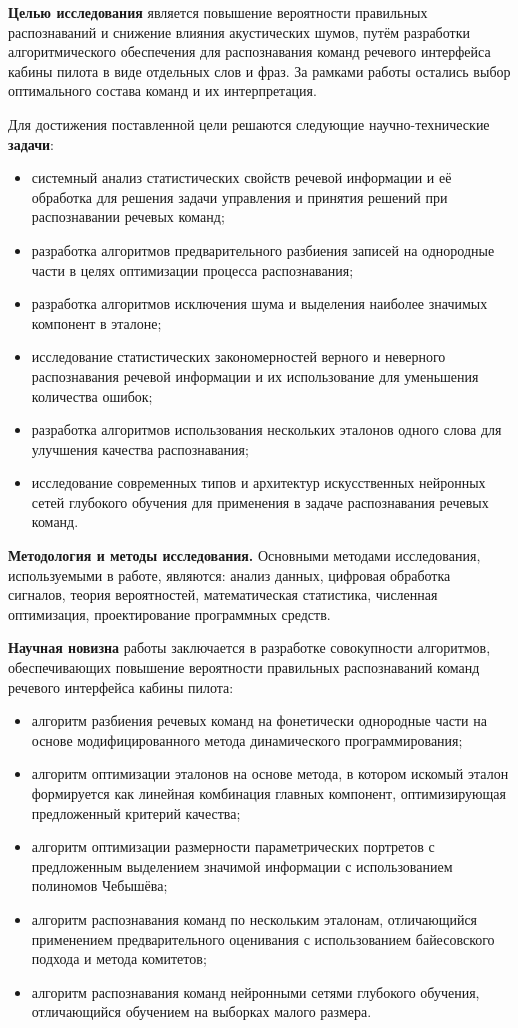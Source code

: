\textbf{Целью исследования} является повышение вероятности правильных распознаваний и снижение влияния акустических шумов, путём разработки алгоритмического обеспечения для распознавания команд речевого интерфейса кабины пилота в виде отдельных слов и фраз.
За рамками работы остались выбор оптимального состава команд и их интерпретация.

Для достижения поставленной цели решаются следующие научно-технические \textbf{задачи}:
\begin{itemize}
	\item системный анализ статистических свойств речевой информации и её обработка для решения задачи управления и принятия решений при распознавании речевых команд;
	\item разработка алгоритмов предварительного разбиения записей на однородные части в целях оптимизации процесса распознавания;
	\item разработка алгоритмов исключения шума и выделения наиболее значимых компонент в эталоне;
	\item исследование статистических закономерностей верного и неверного распознавания речевой информации и их использование для уменьшения количества ошибок;
	\item разработка алгоритмов использования нескольких эталонов одного слова для улучшения качества распознавания;
	\item исследование современных типов и архитектур искусственных нейронных сетей глубокого обучения для применения в задаче распознавания речевых команд.
\end{itemize}

\textbf{Методология и методы исследования.}
Основными методами исследования, используемыми в работе, являются: анализ данных, цифровая обработка сигналов, теория вероятностей, математическая статистика, численная оптимизация, проектирование программных средств.

\textbf{Научная новизна} работы заключается в разработке совокупности алгоритмов, обеспечивающих повышение вероятности правильных распознаваний команд речевого интерфейса кабины пилота:
\begin{itemize}
	\item алгоритм разбиения речевых команд на фонетически однородные части на основе модифицированного метода динамического программирования;
	\item алгоритм оптимизации эталонов на основе метода, в котором искомый эталон формируется как линейная комбинация главных компонент, оптимизирующая предложенный критерий качества;
	\item алгоритм оптимизации размерности параметрических портретов с предложенным выделением значимой информации с использованием полиномов Чебышёва;
	\item алгоритм распознавания команд по нескольким эталонам, отличающийся применением предварительного оценивания с использованием байесовского подхода и метода комитетов;
	\item алгоритм распознавания команд нейронными сетями глубокого обучения, отличающийся обучением на выборках малого размера.
\end{itemize}

